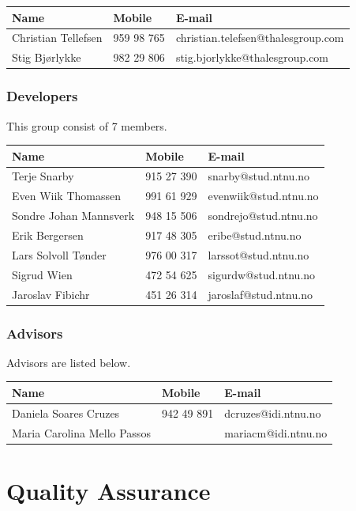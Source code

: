 \begin{tabular}{|l |l |l |}
	\hline
	\textbf{Name} & \textbf{Mobile} & \textbf{E-mail}  \\ \hline
	Christian Tellefsen & 959 98 765 & christian.telefsen@thalesgroup.com \\ \hline
	Stig Bjørlykke & 982 29 806 & stig.bjorlykke@thalesgroup.com \\ \hline
\end{tabular}


\subsubsection{Developers}
This group consist of 7 members.

\begin{tabular}{|l |l |l |}
	\hline
	\textbf{Name} & \textbf{Mobile} & \textbf{E-mail}  \\ \hline
	Terje Snarby & 915 27 390 & snarby@stud.ntnu.no \\ \hline
	Even Wiik Thomassen & 991 61 929 & evenwiik@stud.ntnu.no \\ \hline
	Sondre Johan Mannsverk & 948 15 506 & sondrejo@stud.ntnu.no \\ \hline
	Erik Bergersen & 917 48 305 & eribe@stud.ntnu.no \\ \hline
	Lars Solvoll Tønder & 976 00 317 & larssot@stud.ntnu.no \\ \hline
	Sigrud Wien & 472 54 625 & sigurdw@stud.ntnu.no \\ \hline
	Jaroslav Fibichr & 451 26 314 & jaroslaf@stud.ntnu.no \\ \hline
\end{tabular}

\subsubsection{Advisors}
Advisors are listed below.

\begin{tabular}{|l |l |l |}
	\hline
	\textbf{Name} & \textbf{Mobile} & \textbf{E-mail}  \\ \hline
	Daniela Soares Cruzes & 942 49 891 & dcruzes@idi.ntnu.no \\ \hline
	Maria Carolina Mello Passos & & mariacm@idi.ntnu.no \\ \hline
\end{tabular}

\section{Quality Assurance}

